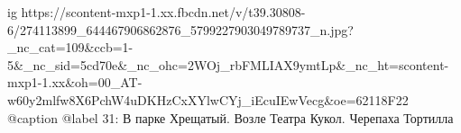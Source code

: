  
 
 
 
 

\ifcmt
  ig https://scontent-mxp1-1.xx.fbcdn.net/v/t39.30808-6/274113899_644467906862876_5799227903049789737_n.jpg?_nc_cat=109&ccb=1-5&_nc_sid=5cd70e&_nc_ohc=2WOj_rbFMLIAX9ymtLp&_nc_ht=scontent-mxp1-1.xx&oh=00_AT-w60y2mlfw8X6PchW4uDKHzCxXYlwCYj_iEcuIEwVecg&oe=62118F22
  @caption @label 31: В парке Хрещатый. Возле Театра Кукол. Черепаха Тортилла
\fi
